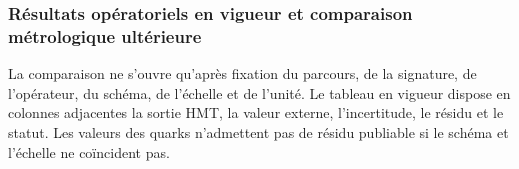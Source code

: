 \let\subsection\subsubsection
\let\subsubsection\paragraph
\let\clearpage\relax

\endgroup
\begingroup
\let\chapter\section
\let\section\subsection
\let\subsection\subsubsection
\let\subsubsection\paragraph
\let\clearpage\relax

\endgroup

\section{Résultats opératoriels en vigueur et comparaison métrologique ultérieure}
La comparaison ne s’ouvre qu’après fixation du parcours, de la signature, de l’opérateur, du schéma, de l’échelle et de l’unité. Le tableau en vigueur dispose en colonnes adjacentes la sortie HMT, la valeur externe, l’incertitude, le résidu et le statut. Les valeurs des quarks n’admettent pas de résidu publiable si le schéma et l’échelle ne coïncident pas.

